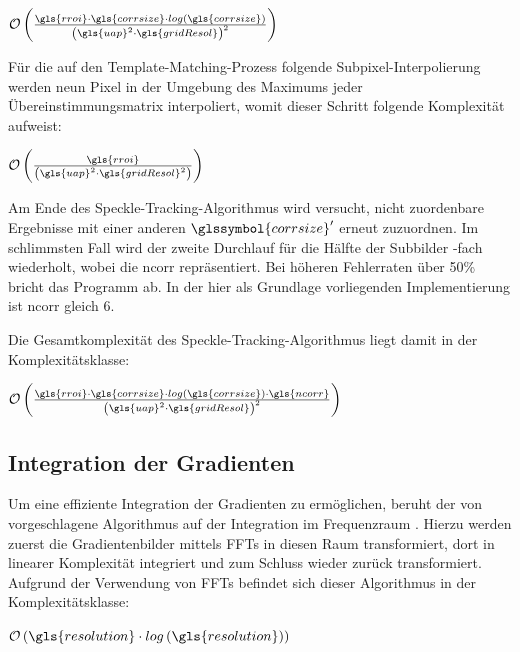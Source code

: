\begin{center}
	$\mathcal{O}\left(\frac{\gls{rroi} \cdot \gls{corrsize} \cdot log\left(\gls{corrsize}\right)}{\left(\gls{uap}^2 \cdot \gls{gridResol}\right)^2}\right)$
\end{center}

Für die auf den Template-Matching-Prozess folgende Subpixel-Interpolierung werden neun Pixel in der Umgebung des Maximums jeder Übereinstimmungsmatrix interpoliert, womit dieser Schritt folgende Komplexität aufweist:

\begin{center}
	$\mathcal{O}\left(\frac{\gls{rroi}}{\left(\gls{uap}^2 \cdot \gls{gridResol}^2\right)}\right)$
\end{center}

Am Ende des Speckle-Tracking-Algorithmus wird versucht, nicht zuordenbare Ergebnisse mit einer anderen  $\glssymbol{corrsize}'$ erneut zuzuordnen. Im schlimmsten Fall wird der zweite Durchlauf für die Hälfte der Subbilder -fach wiederholt, wobei  die \gls{ncorr} repräsentiert. Bei höheren Fehlerraten über 50\% bricht das Programm ab. In der hier als Grundlage vorliegenden Implementierung ist \gls{ncorr} gleich 6.

Die Gesamtkomplexität des Speckle-Tracking-Algorithmus liegt damit in der Komplexitätsklasse:

\begin{center}
	$\mathcal{O}\left(\frac{\gls{rroi} \cdot \gls{corrsize} \cdot log\left(\gls{corrsize}\right) \cdot \gls{ncorr}}{\left(\gls{uap}^2 \cdot \gls{gridResol}\right)^2}\right)$
\end{center}

\subsection{Integration der Gradienten}

Um eine effiziente Integration der Gradienten zu ermöglichen, beruht der von \citeauthor{FC88} vorgeschlagene Algorithmus auf der Integration im Frequenzraum \cite{FC88}. Hierzu werden zuerst die Gradientenbilder mittels \glspl{FFT} in diesen Raum transformiert, dort in linearer Komplexität integriert und zum Schluss wieder zurück transformiert. 
Aufgrund der Verwendung von \glspl{FFT} befindet sich dieser Algorithmus in der Komplexitätsklasse:

\begin{center}
	$\mathcal{O}\left(\gls{resolution} \cdot log\left(\gls{resolution}\right)\right)$
\end{center}

